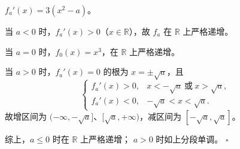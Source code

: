 $f_a'(x)=3(x^2-a)$。

当 $a<0$ 时，$f_a'(x)>0$（$x\in\mathbb R$），故 $f_a$ 在 $\mathbb R$ 上严格递增。

当 $a=0$ 时，$f_0(x)=x^3$，在 $\mathbb R$ 上严格递增。

当 $a>0$ 时，$f_a'(x)=0$ 的根为 $x=\pm\sqrt a$，且
\[
\begin{cases}
 f_a'(x)>0,& x<-\sqrt a\ \text{或}\ x>\sqrt a,\\
 f_a'(x)<0,& -\sqrt a<x<\sqrt a.
\end{cases}
\]
故增区间为 $(-\infty,-\sqrt a]$、$[\sqrt a,+\infty)$，减区间为 $[-\sqrt a,\sqrt a]$。

综上，$\boxed{a\le0\text{ 时在 }\mathbb R\text{ 上严格递增； } a>0\text{ 时如上分段单调。}}$ $\square$
